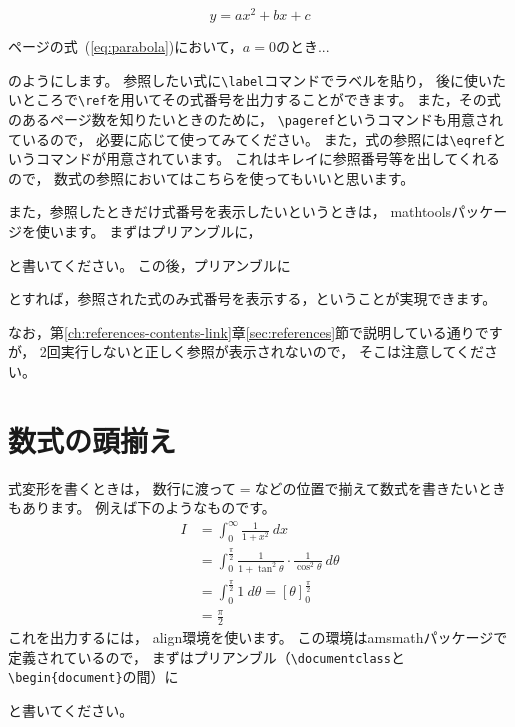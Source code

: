 \documentclass[class=jreport, crop=false, preview=false, dvipdfmx, fleqn]{standalone}
\begin{document}
\begin{IOTeX}
\begin{equation}
y = ax^2 + bx + c \label{eq:parabola}
\end{equation}

\pageref{eq:parabola}ページの式~(\ref{eq:parabola})において，$a=0$のとき...
\end{IOTeX}

のようにします。
参照したい式に\verb|\label|コマンドでラベルを貼り，
後に使いたいところで\verb|\ref|を用いてその式番号を出力することができます。
また，その式のあるページ数を知りたいときのために，
\verb|\pageref|というコマンドも用意されているので，
必要に応じて使ってみてください。
また，式の参照には\verb|\eqref|というコマンドが用意されています。
これはキレイに参照番号等を出してくれるので，
数式の参照においてはこちらを使ってもいいと思います。

また，参照したときだけ式番号を表示したいというときは，
mathtoolsパッケージを使います。
まずはプリアンブルに，
\begin{ITeX}
\usepackage{mathtools}
\end{ITeX}
と書いてください。
この後，プリアンブルに
\begin{ITeX}
\end{ITeX}
とすれば，参照された式のみ式番号を表示する，ということが実現できます。

なお，第\ref{ch:references-contents-link}章\ref{sec:references}節で説明している通りですが，
2回実行しないと正しく参照が表示されないので，
そこは注意してください。




\section{数式の頭揃え}
\label{sec:align}

式変形を書くときは，
数行に渡って$=$などの位置で揃えて数式を書きたいときもあります。
例えば下のようなものです。
\begin{align*}
I & = \int_0^{\infty} \frac{1}{1 + x^2} \ dx \\
	& = \int_0^{\frac{\pi}{2}} \frac{1}{1 + \tan^2 \theta} \cdot \frac{1}{\cos^2 \theta} \ d\theta \\
	& = \int_0^{\frac{\pi}{2}} 1 \ d\theta = \left[ \theta \right]_0^{\frac{\pi}{2}} \\
	& = \frac{\pi}{2}
\end{align*}
これを出力するには，
align環境を使います。
この環境はamsmathパッケージで定義されているので，
まずはプリアンブル（\verb|\documentclass|と\verb|\begin{document}|の間）に
\begin{ITeX}
\usepackage{amsmath}
\end{ITeX}
と書いてください。
\end{document}
